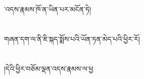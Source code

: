 ་འདས་རྣམས་ཁོ་ན་ཡིན་པར་མངོན་ཏེ།\chapter{ }གཞན་དག་ལ་ནི་ཇི་སྐད་སྨོས་པའི་ཡོན་ཏན་མེད་པའི་ཕྱིར་རོ།\chapter{ }།དེའི་ཕྱིར་བཅོམ་ལྡན་འདས་རྣམས་ལ་ཕྱ